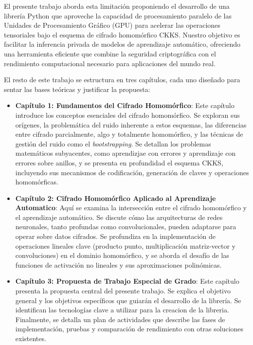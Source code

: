 El presente trabajo aborda esta limitación proponiendo el desarrollo de una librería Python que aproveche la capacidad de procesamiento paralelo de las Unidades de Procesamiento Gráfico (GPU) para acelerar las operaciones tensoriales bajo el esquema de cifrado homomórfico CKKS. Nuestro objetivo es facilitar la inferencia privada de modelos de aprendizaje automático, ofreciendo una herramienta eficiente que combine la seguridad criptográfica con el rendimiento computacional necesario para aplicaciones del mundo real.

El resto de este trabajo se estructura en tres capítulos, cada uno diseñado para sentar las bases teóricas y justificar la propuesta:

\begin{itemize}
   \item \textbf{Capítulo 1: Fundamentos del Cifrado Homomórfico}:
Este capítulo introduce los conceptos esenciales del cifrado homomórfico. Se exploran sus orígenes, la problemática del ruido inherente a estos esquemas, las diferencias entre cifrado parcialmente, algo y totalmente homomórfico, y las técnicas de gestión del ruido como el \textit{bootstrapping}. Se detallan los problemas matemáticos subyacentes, como aprendizjae con errores y aprendizaje con errores sobre anillos, y se presenta en profundidad el esquema CKKS, incluyendo sus mecanismos de codificación, generación de claves y operaciones homomórficas.

   \item \textbf{Capítulo 2: Cifrado Homomórfico Aplicado al Aprendizaje Automatico}:
Aquí se examina la intersección entre el cifrado homomórfico y el aprendizaje automático. Se discute cómo las arquitecturas de redes neuronales, tanto profundas como convolucionales, pueden adaptarse para operar sobre datos cifrados. Se profundiza en la implementación de operaciones lineales clave (producto punto, multiplicación matriz-vector y convoluciones) en el dominio homomórfico, y se aborda el desafío de las funciones de activación no lineales y sus aproximaciones polinómicas. 

   \item \textbf{Capítulo 3: Propuesta de Trabajo Especial de Grado}:
Este capítulo presenta la propuesta central del presente trabajo. Se explica el objetivo general y los objetivos específicos que guiarán el desarrollo de la librería. Se identifican las tecnologías clave a utilizar para la creacion de la libreria. Finalmente, se detalla un plan de actividades que describe las fases de implementación, pruebas y comparación de rendimiento con otras soluciones existentes.
\end{itemize}

